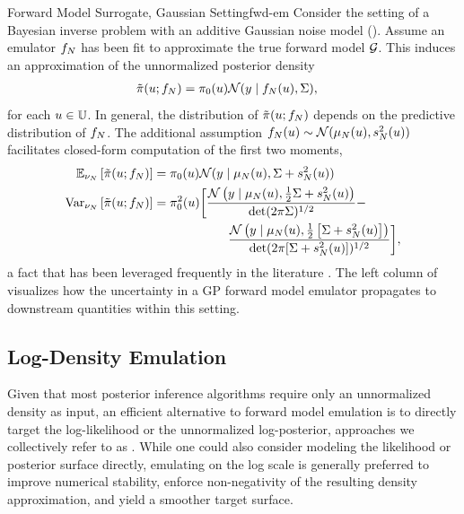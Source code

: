 \documentclass[12pt]{article}
\begin{document}
\begin{examplebox}{Forward Model Surrogate, Gaussian Setting}{fwd-em}
Consider the setting of a Bayesian inverse problem with an additive Gaussian noise model
(). Assume an emulator $f_{N}$ has been 
fit to approximate the true forward model $\mathcal{G}$. This induces an approximation of the 
unnormalized posterior density 
\begin{align}
\tilde{\pi}(u; f_{N}) &= \pi_0(u)\mathcal{N}(y \mid f_{N}(u), \Sigma),
\label{eq:fwd-em-Gaussian}
\end{align}
for each $u \in \mathbb{U}$. In general, the distribution of $\tilde{\pi}(u; f_{N})$ depends on 
the predictive distribution of $f_{N}$. The additional assumption 
$f_{N}(u) \sim \mathcal{N}(\mu_{N}(u), s^2_{N}(u))$ facilitates closed-form computation
of the first two moments,
\begin{align*}
\mathbb{E}_{\nu_{N}}\left[\tilde{\pi}(u; f_{N}) \right] 
&= \pi_0(u) \mathcal{N}(y \mid \mu_{N}(u), \Sigma + s^2_{N}(u)) \\
\mathrm{Var}_{\nu_{N}}\left[\tilde{\pi}(u; f_{N}) \right]
&= \pi_0^2(u) \bigg[\frac{\mathcal{N}\left(y \mid \mu_{N}(u), \frac{1}{2}\Sigma + 
s^2_{N}(u)  \right)}{\det(2\pi \Sigma)^{1/2}} - \\
&\qquad \qquad\qquad \frac{\mathcal{N}\left(y \mid \mu_{N}(u), \frac{1}{2}\left[\Sigma + s^2_{N}(u)\right]  \right)}{\det(2\pi [\Sigma + s^2_{N}(u)])^{1/2}}\bigg],
\end{align*}
a fact that has been leveraged frequently in the literature
\citep{StuartTeck1,GP_PDE_priors,hydrologicalModel,hydrologicalModel2,Surer2023sequential,
VillaniAdaptiveGP,weightedIVAR,idealizedGCM,CES}. The left column of 
visualizes how the uncertainty in a GP forward model emulator propagates to downstream 
quantities within this setting.
\end{examplebox}

\subsection{Log-Density Emulation} \label{sec:log_density_emulation}
Given that most posterior inference algorithms require only an unnormalized density as input, 
an efficient alternative to forward model emulation is to directly target the log-likelihood or 
the unnormalized log-posterior, approaches we collectively refer to as .
While one could also consider modeling the likelihood or posterior surface directly,
emulating on the log scale is generally preferred to improve numerical stability, enforce
non-negativity of the resulting density approximation, and yield a smoother target surface. 
\end{document}

